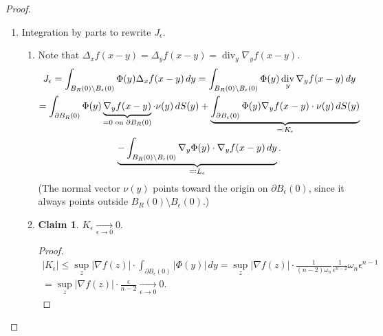 \documentclass[12pt]{article}
\DeclareMathOperator{\diver}{div}
\theoremstyle{definition}
\newtheorem*{claim*}{Claim}
\begin{document}
\begin{proof}
\begin{enumerate}[label=\arabic*.]
\item Integration by parts to rewrite $J_{\epsilon}$.

\begin{enumerate}[label=(\arabic*),resume]
\item\label{integrals} Note that $\Delta_xf(x-y)=\Delta_yf(x-y)=\diver_y\nabla_yf(x-y)$.
\begin{multline*}
J_{\epsilon}=\int_{B_R(0)\setminus B_{\epsilon}(0)}\Phi(y)\Delta_xf(x-y)\,dy=\int_{B_R(0)\setminus B_{\epsilon}(0)}\Phi(y)\diver_y\nabla_yf(x-y)\,dy\\
=\int_{\partial B_R(0)}\Phi(y)\underbrace{\nabla_yf(x-y)}_{\mathclap{=0\text{ on }\partial B_R(0)}}\cdot\nu(y)\,dS(y)+\underbrace{\int_{\partial B_{\epsilon}(0)}\Phi(y)\nabla_yf(x-y)\cdot\nu(y)\,dS(y)}_{\eqqcolon K_{\epsilon}}\\
\underbrace{-\int_{B_R(0)\setminus B_{\epsilon}(0)}\nabla_y\Phi(y)\cdot\nabla_yf(x-y)\,dy}_{\eqqcolon L_{\epsilon}}.
\end{multline*}
(The normal vector $\nu(y)$ points toward the origin on $\partial B_{\epsilon}(0)$, since it always points outside $B_R(0)\setminus B_{\epsilon}(0)$.)

\item\label{Kepsto0}
\begin{claim*}
$K_{\epsilon}\xrightarrow[\epsilon\to0]{}0$.
\end{claim*}

\begin{proof}
\begin{multline*}
|K_{\epsilon}|\leq\sup_z|\nabla f(z)|\cdot\int_{\partial B_{\epsilon}(0)}|\Phi(y)|\,dy=\sup_z|\nabla f(z)|\cdot\frac{1}{(n-2)\omega_n}\frac{1}{\epsilon^{n-2}}\omega_n\epsilon^{n-1}\\
=\sup_z|\nabla f(z)|\cdot\frac{\epsilon}{n-2}\xrightarrow[\epsilon\to0]{}0.
\end{multline*}
\end{proof}
\end{enumerate}


\end{enumerate}
\end{proof}
\end{document}
